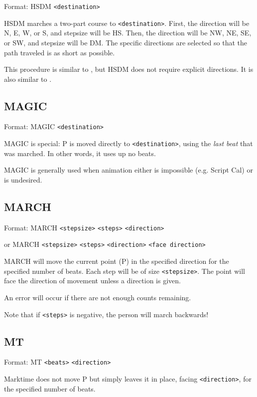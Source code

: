 Format: HSDM \verb$<destination>$

HSDM marches a two-part course to \verb$<destination>$.  First, the
direction will be N, E, W, or S, and stepsize will be HS.  Then, the
direction will be NW, NE, SE, or SW, and stepsize will be DM.  The
specific directions are selected so that the path traveled is as short
as possible.

This procedure is similar to , but HSDM does
not require explicit directions.  It is also similar to .


\subsection{MAGIC}\label{magic}

Format: MAGIC \verb$<destination>$

MAGIC is special: P is moved directly to \verb$<destination>$, using the
{\it last beat} that was marched.  In other words, it uses up no beats.

MAGIC is generally used when animation either is impossible (e.g. Script
Cal) or is undesired.

\subsection{MARCH}\label{march}

Format: MARCH \verb$<stepsize>$ \verb$<steps>$ \verb$<direction>$

or MARCH \verb$<stepsize>$ \verb$<steps>$ \verb$<direction>$
\verb$<face direction>$

MARCH will move the current point (P) in the specified direction for the
specified number of beats.  Each step will be of size
\verb$<stepsize>$.  The point will face the direction of movement unless
a direction is given.

An error will occur if there are not enough counts remaining.

Note that if \verb$<steps>$ is negative, the person will march backwards!

\subsection{MT}\label{mt}

Format: MT \verb$<beats>$ \verb$<direction>$

Marktime does not move P but simply leaves it in place, facing
\verb$<direction>$, for the specified number of beats.

